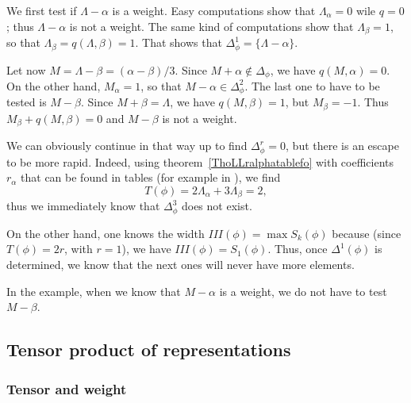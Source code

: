 We first test if $\Lambda-\alpha$ is a weight. Easy computations show that  $\Lambda_{\alpha}=0$ wile $q=0$; thus $\Lambda-\alpha$ is not a weight. The same kind of computations show that $\Lambda_{\beta}=1$, so that $\Lambda_{\beta}=q(\Lambda,\beta)=1$. That shows that $\Delta_{\phi}^1=\{ \Lambda-\alpha \}$.

Let now $M=\Lambda-\beta=(\alpha-\beta)/3$. Since $M+\alpha\notin\Delta_{\phi}$, we have $q(M,\alpha)=0$. On the other hand, $M_{\alpha}=1$, so that $M-\alpha\in\Delta_{\phi}^2$. The last one to have to be tested is $M-\beta$. Since $M+\beta=\Lambda$, we have $q(M,\beta)=1$, but $M_{\beta}=-1$. Thus $M_{\beta}+q(M,\beta)=0$ and $M-\beta$ is not a weight.

We can obviously continue in that way up to find $\Delta_{\phi}^r=0$, but there is an escape to be more rapid. Indeed, using theorem~\ref{ThoLLralphatablefo} with coefficients $r_{\alpha}$ that can be found in tables (for example in \cite{Wybourne}), we find
\begin{equation}
	T(\phi)=2\Lambda_{\alpha}+3\Lambda_{\beta}=2,
\end{equation}
thus we immediately know that $\Delta^3_{\phi}$ does not exist.

On the other hand, one knows the width $III(\phi)=\max S_k(\phi)$ because (since $T(\phi)=2r$, with $r=1$), we have $III(\phi)=S_1(\phi)$. Thus, once $\Delta^1(\phi)$ is determined, we know that the next ones will never have more elements.

In the example, when we know that $M-\alpha$ is a weight, we do not have to test $M-\beta$.

\label{LeTravail}

\subsection{Tensor product of representations}

\subsubsection{Tensor and weight}


